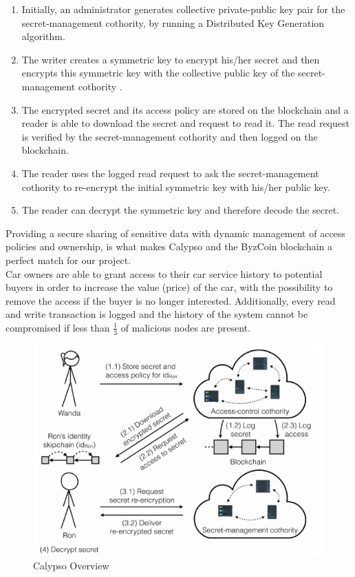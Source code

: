 \begin{enumerate}[start=0]
    \item Initially, an administrator generates collective private-public key pair for the secret-management cothority, by running a Distributed Key Generation algorithm.
    \item The writer creates a symmetric key to encrypt his/her secret and then encrypts this symmetric key with the collective public key of the secret-management cothority \cite{Calypso}.
    \item The encrypted secret and its access policy are stored on the blockchain and a reader is able to download the secret and request to read it. The read request is verified by the secret-management cothority and then logged on the blockchain.
    \item The reader uses the logged read request to ask the secret-management cothority to re-encrypt the initial symmetric key with his/her public key.
    \item  The reader can decrypt the symmetric key and therefore decode the secret.
\end{enumerate}
Providing a secure sharing of sensitive data with dynamic management of access policies and ownership, is what makes Calypso and the ByzCoin blockchain a perfect match for our project.\\
\newline
Car owners are able to grant access to their car service history to potential buyers in order to increase the value (price) of the car, with the possibility to remove the access if the buyer is no longer interested.
Additionally, every read and write transaction is logged and the history of the system cannot be compromised if less than $\frac{1}{3}$ of malicious nodes are present.

\begin{figure}[H]
    \centering
    \includegraphics{Figures/Calypso.png}
    \caption{Calypso Overview \cite{Calypso}}
    \label{Calypso Overview}
\end{figure}

